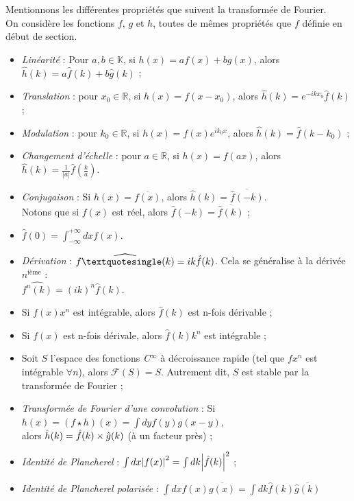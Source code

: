 \documentclass[../notesdecours.tex]{subfiles}
\begin{document}
\begin{Property}
Mentionnons les différentes propriétés que suivent la transformée de Fourier. \\
On considère les fonctions $f$, $g$ et $h$, toutes de mêmes propriétés que $f$ définie en début de section. 
\begin{itemize}[label = \textbullet]
\item \textit{Linéarité} : Pour $a,b \in \mathbb{K}$, si $h(x) = af(x) + bg(x)$, alors $\hat{h}(k) = a\hat{f}(k) + b\hat{g}(k)$ ;
\item \textit{Translation} : pour $x_0 \in \mathbb{R}$, si $h(x) = f(x-x_0)$, alors $\hat{h}(k) = e^{-ikx_0}\hat{f}(k)$ ; 
\item \textit{Modulation} : pour $k_0 \in \mathbb{R}$, si $h(x) = f(x) e^{ik_0 x}$, alors $\hat{h}(k) = \hat{f}(k-k_0)$ ;
\item \textit{Changement d'échelle} : pour $a \in \mathbb{R}$, si $h(x) = f(ax)$, alors $\hat{h}(k) = \frac{1}{|a|}\hat{f}(\frac{k}{a})$.
\item \textit{Conjugaison} : Si $h(x) = \overline{f(x)}$, alors $\hat{h}(k) = \overline{\hat{f}(-k)}$. \\
Notons que si $f(x)$ est réel, alors $\hat{f}(-k) = \overline{\hat{f}(k)}$ ;
\item $\hat{f}(0) = \int_{-\infty}^{+\infty} dxf(x)$.
\item \textit{Dérivation} : $\widehat{f \textquotesingle (k)} =ik \hat{f}(k)$. Cela se généralise à la dérivée $n^{\mbox{ième}}$ : \\
$\widehat{f^n (k)} = (ik)^n \hat{f}(k)$. 
\item Si $f(x)x^n$ est intégrable, alors $\hat{f}(k)$ est n-fois dérivable ; 
\item Si $f(x)$ est n-fois dérivale, alors $\hat{f}(k)k^n$ est intégrable ; 
\item Soit $S$ l'espace des fonctions \textit{C}$^{\infty}$ à décroissance rapide (tel que $fx^n$ est intégrable $\forall n$), alors $\mathcal{F}(S) = S$. 
Autrement dit, $S$ est stable par la transformée de Fourier ;
\item \textit{Transformée de Fourier d'une convolution} : Si $h(x) = (f \star h)(x) = \int dy f(y)g(x-y)$, \\
alors $\hat{h}(k) = \hat{f}(k)\times\hat{g}(k)$ (à un facteur près) ;
\item \textit{Identité de Plancherel} : $\int dx \abs{f(x)}^2 = \int dk \abs{\hat{f}(k)}^2$ ; 
\item \textit{Identité de Plancherel polarisée} : $\int dx f(x)\overline{g(x)} = \int dk \hat{f}(k)\overline{\hat{g}(k)}$ 
\end{itemize}
\end{Property}
\end{document}

